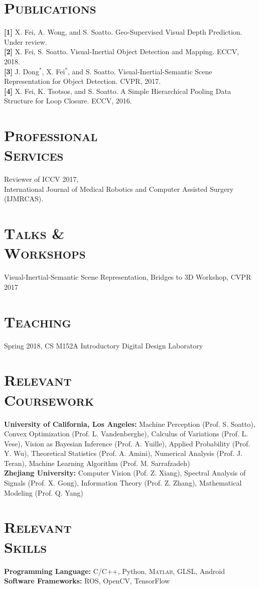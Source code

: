 \documentclass[margin, line, 10pt]{res} %
\begin{document}
\begin{resume}
\section{\textsc{Publications}}

\textbf{[1]} X. Fei, A. Wong, and S. Soatto. Geo-Supervised Visual Depth Prediction. Under review.\\
\textbf{[2]} X. Fei, S. Soatto. Visual-Inertial Object Detection and Mapping. ECCV, 2018.\\
\textbf{[3]} J. Dong$^*$, X. Fei$^*$, and S. Soatto. Visual-Inertial-Semantic Scene Representation for Object Detection. CVPR, 2017.\\
\textbf{[4]} X. Fei, K. Tsotsos, and S. Soatto. A Simple Hierarchical Pooling Data Structure for Loop Closure. ECCV, 2016.

\section{\textsc{Professional\\Services}}
Reviewer of ICCV 2017,\\
International Journal of Medical Robotics and Computer Assisted Surgery (IJMRCAS).

\section{\textsc{Talks \&\\Workshops}}
Visual-Inertial-Semantic Scene Representation, Bridges to 3D Workshop, CVPR 2017

\section{\textsc{Teaching}}
Spring 2018, CS M152A Introductory Digital Design Laboratory

\section{\textsc{Relevant\\Coursework}}
\textbf{University of California, Los Angeles:} Machine Perception (Prof. S. Soatto), Convex Optimization (Prof. L. Vandenberghe), Calculus of Variations (Prof. L. Vese), Vision as Bayesian Inference (Prof. A. Yuille), Applied Probability (Prof. Y. Wu), Theoretical Statistics (Prof. A. Amini), Numerical Analysis (Prof. J. Teran), Machine Learning Algorithm (Prof. M. Sarrafzadeh)\\
\textbf{Zhejiang University:} Computer Vision (Pof. Z. Xiang), Spectral Analysis of Signals (Prof. X. Gong), Information Theory (Prof. Z. Zhang), Mathematical Modeling (Prof. Q. Yang)

\section{\textsc{Relevant\\Skills}}
\textbf{Programming Language:} C/C++, Python, \textsc{Matlab}, GLSL, Android\\
\textbf{Software Frameworks:} ROS, OpenCV, TensorFlow


\end{resume}
\end{document}
